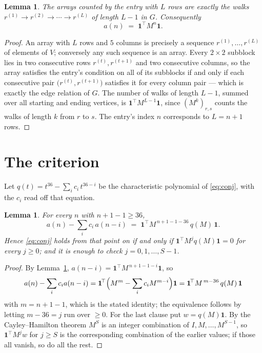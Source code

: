 \documentclass[11pt,a4paper]{article}
\theoremstyle{plain}
\newtheorem{lemma}[theorem]{Lemma}
\theoremstyle{definition}
\begin{document}
\begin{lemma}\label{lem:walk}
The arrays counted by the entry with $L$ rows are exactly the walks
$r^{(1)}\to r^{(2)}\to\cdots\to r^{(L)}$ of length $L-1$ in $G$. Consequently
\[
a(n)\;=\;\mathbf{1}^{\!\top}M^{n}\mathbf{1} .
\]
\end{lemma}

\begin{proof}
An array with $L$ rows and $5$ columns is precisely a sequence
$r^{(1)},\dots,r^{(L)}$ of elements of $V$; conversely any such sequence is an array.
Every $2\times2$ subblock lies in two consecutive rows $r^{(t)},r^{(t+1)}$ and two
consecutive columns, so the array satisfies the entry's condition on all of its subblocks
if and only if each consecutive pair $\bigl(r^{(t)},r^{(t+1)}\bigr)$ satisfies it for
every column pair --- which is exactly the edge relation of $G$. The number of walks of
length $L-1$, summed over all starting and ending vertices, is
$\mathbf{1}^{\!\top}M^{L-1}\mathbf{1}$, since $(M^{k})_{r,s}$ counts the walks of
length $k$ from $r$ to $s$. The entry's index $n$ corresponds to $L=n+1$ rows.
\end{proof}

\section{The criterion}

Let $q(t)=t^{36}-\sum_i c_i\,t^{36-i}$ be the characteristic polynomial of
\eqref{eq:conj}, with the $c_i$ read off that equation.

\begin{lemma}\label{lem:crit}
For every $n$ with $n+1-1\ge36$,
\[
a(n)-\sum_i c_i\,a(n-i)\;=\;\mathbf{1}^{\!\top}M^{\,n+1-1-36}\,q(M)\,\mathbf{1} .
\]
Hence \eqref{eq:conj} holds from that point on if and only if
$\mathbf{1}^{\!\top}M^{j}q(M)\mathbf{1}=0$ for every $j\ge0$; and it is enough to check
$j=0,1,\dots,S-1$.
\end{lemma}

\begin{proof}
By Lemma~\ref{lem:walk}, $a(n-i)=\mathbf{1}^{\!\top}M^{\,n+1-1-i}\mathbf{1}$, so
\[
a(n)-\sum_i c_i a(n-i)
=\mathbf{1}^{\!\top}\Bigl(M^{m}-\sum_i c_i M^{m-i}\Bigr)\mathbf{1}
=\mathbf{1}^{\!\top}M^{\,m-36}\,q(M)\,\mathbf{1}
\]
with $m=n+1-1$, which is the stated identity; the equivalence follows by letting
$m-36=j$ run over $\ge0$. For the last clause put $w=q(M)\mathbf{1}$. By the
Cayley--Hamilton theorem $M^{S}$ is an integer combination of $I,M,\dots,M^{S-1}$, so
$\mathbf{1}^{\!\top}M^{j}w$ for $j\ge S$ is the corresponding combination of the earlier
values; if those all vanish, so do all the rest.
\end{proof}
\end{document}
